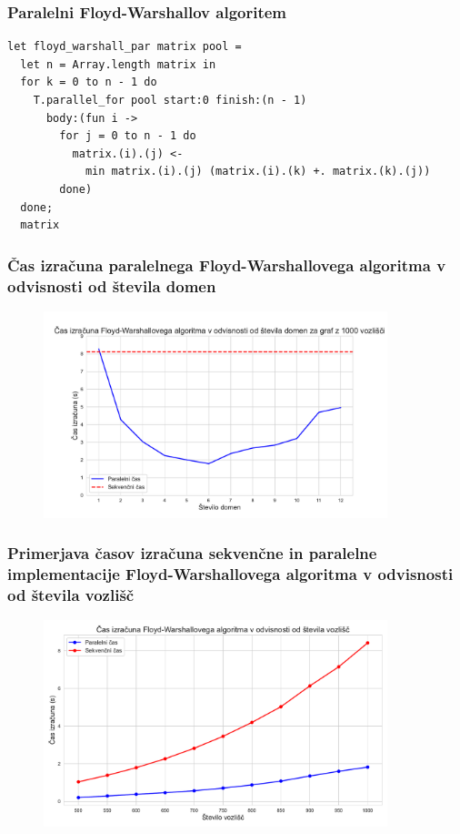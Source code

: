 \documentclass{beamer}
\begin{document}
\begin{frame}[fragile]
  \frametitle{Paralelni Floyd-Warshallov algoritem}
  \begin{verbatim}
let floyd_warshall_par matrix pool =
  let n = Array.length matrix in
  for k = 0 to n - 1 do
    T.parallel_for pool start:0 finish:(n - 1)
      body:(fun i ->
        for j = 0 to n - 1 do
          matrix.(i).(j) <-
            min matrix.(i).(j) (matrix.(i).(k) +. matrix.(k).(j))
        done)
  done;
  matrix
\end{verbatim}

\end{frame}

\begin{frame}
  \frametitle{Čas izračuna paralelnega Floyd-Warshallovega algoritma v odvisnosti od števila domen}
  \begin{figure}[h!]
    \centering
    \includegraphics[width=10cm]{slike/floyd_v_odvisnosti_od_stevila_domen.pdf}
  \end{figure}
\end{frame}

\begin{frame}
  \frametitle{Primerjava časov izračuna sekvenčne in paralelne implementacije Floyd-Warshallovega algoritma v odvisnosti od števila vozlišč}
  \begin{figure}[h!]
    \centering
    \includegraphics[width=10cm]{slike/floyd_v_odvisnosti_od_velikosti_grafa.pdf}
  \end{figure}
\end{frame}
\end{document}
